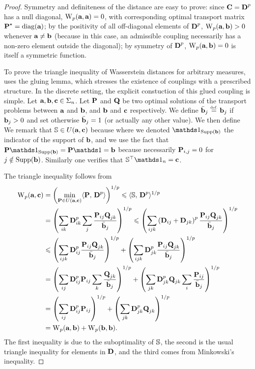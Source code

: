 \begin{proof}

Symmetry and definiteness of the distance are easy to prove: since $\C = \distD^p$ has a null diagonal, $\WassD_p(\a,\a)=0$, with corresponding optimal transport matrix $\P^\star=\diag(\a)$; by the positivity of all off-diagonal elements of $\distD^p$, $\WassD_p(\a,\b)>0$ whenever $\a\ne \b$ (because in this case, an admissible coupling necessarily has a non-zero element outside the diagonal); by symmetry of $\distD^p$, $\WassD_p(\a,\b)=0$ is itself a symmetric function. 


To prove the triangle inequality of Wasserstein distances for arbitrary measures, \cite[Theorem 7.3]{Villani03} uses the gluing lemma, which stresses the existence of couplings with a prescribed structure. 
In the discrete setting, the explicit constuction of this glued coupling is simple.
%
Let $\a,\b,\VectMode{c} \in\simplex_n$. Let $\P$ and $\Q$ be two optimal solutions of the transport problems between $\a$ and $\b$, and $\b$ and $\VectMode{c}$ respectively. 
%
We define $\bar\b_j \eqdef \b_j$ if $\b_j>0$ and set otherwise $\bar\b_j=1$ (or actually any other value). We then define 
We remark that $\SS \in \U(\a,\VectMode{c})$ because 
where we denoted $\ones_{\Supp(\b)}$ the indicator of the support of $\b$, and we use the fact that $\P \ones_{\Supp(\b)} = \P \ones = \b$ because necessarily $\P_{i,j} = 0$ for $j \notin \Supp(\b)$.
Similarly one verifies that $\SS^\top \ones_n = \VectMode{c}$.


The triangle inequality follows from
$$\begin{aligned}
\WassD_p(\a,\VectMode{c})&=\left(\min_{\P\in U(\a,\VectMode{c})}\dotp{\P}{\distD^p}\right)^{1/p} \leq \dotp{\SS}{\distD^p}^{1/p}\\
&= \left(\sum_{ik} \distD^p_{ik}\sum_{j} \frac{\P_{ij}\Q_{jk}}{\bar\b_j}\right)^{1/p} \leq \left(\sum_{ijk} \left(\distD_{ij}+\distD_{jk}\right)^p \frac{\P_{ij}\Q_{jk}}{\bar\b_j}\right)^{1/p} \\
& \leq \left(\sum_{ijk} \distD^p_{ij} \frac{\P_{ij}\Q_{jk}}{\bar\b_j}\right)^{1/p} + \left(\sum_{ijk}\distD^p_{jk} \frac{\P_{ij}\Q_{jk}}{\bar\b_j}\right)^{1/p} \\
&= \left(\sum_{ij} \distD^p_{ij}\P_{ij} \sum_k \frac{\Q_{jk}}{\bar\b_j}\right)^{1/p} + \left(\sum_{jk} \distD^p_{jk} \Q_{jk} \sum_i \frac{\P_{ij}}{\bar\b_j}\right)^{1/p}\\
&= \left(\sum_{ij} \distD^p_{ij}\P_{ij}\right)^{1/p} + \left(\sum_{jk} \distD^p_{jk} \Q_{jk}\right)^{1/p}\\ 
&= \WassD_p(\a,\b) +\WassD_p(\b,\b).
\end{aligned}
$$
%
The first inequality is due to the suboptimality of $\SS$, the second is the usual triangle inequality for elements in $\distD$, and the third comes from Minkowski's inequality.
\end{proof}

